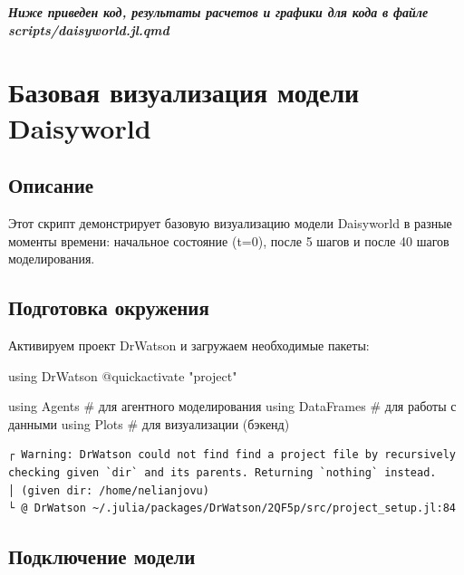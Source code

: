 \documentclass[
  12pt,
  a4paper,
  DIV=11,
  numbers=noendperiod]{scrreprt}
\newenvironment{Shaded}{\begin{snugshade}}{\end{snugshade}}
\newcommand{\BuiltInTok}[1]{\textcolor[rgb]{0.00,0.23,0.31}{#1}}
\newcommand{\CommentTok}[1]{\textcolor[rgb]{0.37,0.37,0.37}{#1}}
\newcommand{\ImportTok}[1]{\textcolor[rgb]{0.00,0.46,0.62}{#1}}
\newcommand{\PreprocessorTok}[1]{\textcolor[rgb]{0.68,0.00,0.00}{#1}}
\newcommand{\StringTok}[1]{\textcolor[rgb]{0.13,0.47,0.30}{#1}}
\begin{document}
\textbf{\emph{Ниже приведен код, результаты расчетов и графики для кода
в файле scripts/daisyworld.jl.qmd}}

\chapter{Базовая визуализация модели
Daisyworld}\label{ux431ux430ux437ux43eux432ux430ux44f-ux432ux438ux437ux443ux430ux43bux438ux437ux430ux446ux438ux44f-ux43cux43eux434ux435ux43bux438-daisyworld}

\section{Описание}\label{ux43eux43fux438ux441ux430ux43dux438ux435}

Этот скрипт демонстрирует базовую визуализацию модели Daisyworld в
разные моменты времени: начальное состояние (t=0), после 5 шагов и после
40 шагов моделирования.

\section{Подготовка
окружения}\label{ux43fux43eux434ux433ux43eux442ux43eux432ux43aux430-ux43eux43aux440ux443ux436ux435ux43dux438ux44f}

Активируем проект DrWatson и загружаем необходимые пакеты:

\begin{Shaded}
\begin{Highlighting}[]
\ImportTok{using} \BuiltInTok{DrWatson}
\PreprocessorTok{@quickactivate} \StringTok{"project"}

\ImportTok{using} \BuiltInTok{Agents}      \CommentTok{\# для агентного моделирования}
\ImportTok{using} \BuiltInTok{DataFrames}  \CommentTok{\# для работы с данными}
\ImportTok{using} \BuiltInTok{Plots}       \CommentTok{\# для визуализации (бэкенд)}
\end{Highlighting}
\end{Shaded}

\begin{verbatim}
┌ Warning: DrWatson could not find find a project file by recursively checking given `dir` and its parents. Returning `nothing` instead.
│ (given dir: /home/nelianjovu)
└ @ DrWatson ~/.julia/packages/DrWatson/2QF5p/src/project_setup.jl:84
\end{verbatim}

\section{Подключение
модели}\label{ux43fux43eux434ux43aux43bux44eux447ux435ux43dux438ux435-ux43cux43eux434ux435ux43bux438}
\end{document}
